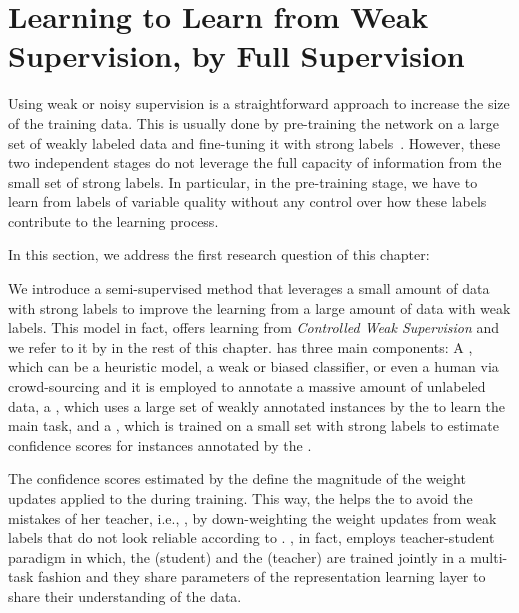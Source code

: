 \section{Learning to Learn from Weak Supervision, by Full Supervision}
\label{sec:meta_learning}
Using weak or noisy supervision is a straightforward approach to increase the size of the training data. This is usually done by pre-training the network on a large set of weakly labeled data and fine-tuning it with strong labels~\cite{Dehghani:2017:SIGIR,Severyn:2015:SIGIR}. 
However, these two independent stages do not leverage the full capacity of information from the small set of strong labels.  In particular, in the pre-training stage, we have to learn from labels of variable quality without any control over how these labels contribute to the learning process.

In this section, we address the first research question of this chapter:

We introduce a semi-\:supervised method that leverages a small amount of data with strong labels to improve the learning from a large amount of data with weak labels. This model in fact, offers learning from \emph{Controlled Weak Supervision} and we refer to it by \emph{\cws} in the rest of this chapter.
%
\cws has three main components:
A \wa, which can be a heuristic model, a weak or biased classifier, or even a human via crowd-sourcing and it is employed to annotate a massive amount of unlabeled data, a \tnet, which uses a large set of weakly annotated instances by the \wa to learn the main task, and a \cnet, which is trained on a small set with strong labels to estimate confidence scores for instances annotated by the \wa. 

The confidence scores estimated by the \cnet define the magnitude of the weight updates applied to the \tnet during training. This way, the \cnet helps the \tnet to avoid the mistakes of her teacher, i.e., \wa, by down-weighting the weight updates from weak labels that do not look reliable according to \cnet.
%
\cws, in fact, employs teacher-student paradigm in which, the \tnet (student) and the \cnet (teacher) are trained jointly in a multi-task fashion and they share parameters of the representation learning layer to share their understanding of the data.

